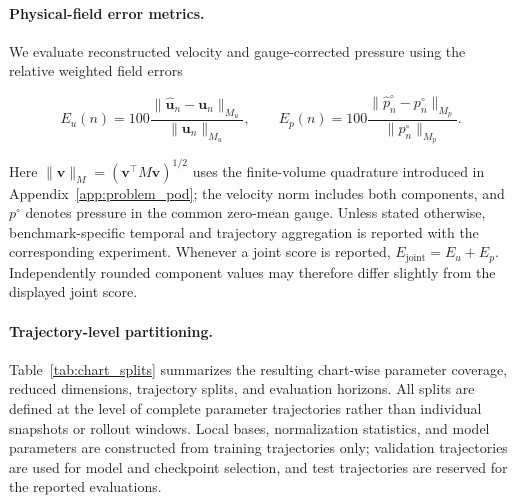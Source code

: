 \documentclass{article}
\begin{document}
\paragraph{Physical-field error metrics.}
We evaluate reconstructed velocity and gauge-corrected pressure using the relative weighted field errors


\begin{equation}
E_u(n)
=
100\frac{
\|\widehat{\bm u}_n-\bm u_n\|_{M_u}
}{
\|\bm u_n\|_{M_u}
},
\qquad
E_p(n)
=
100\frac{
\|\widehat p_n^\circ-p_n^\circ\|_{M_p}
}{
\|p_n^\circ\|_{M_p}
}.
\label{eq:field_errors}
\end{equation}


Here $\|\bm v\|_M=(\bm v^\top M\bm v)^{1/2}$ uses the finite-volume
quadrature introduced in Appendix~\ref{app:problem_pod}; the velocity norm includes both components, and $p^\circ$ denotes pressure in the common zero-mean gauge. Unless stated otherwise, benchmark-specific temporal and trajectory aggregation is reported with the corresponding experiment. Whenever a joint score is reported,
$E_{\mathrm{joint}}=E_u+E_p$. Independently rounded component values may therefore differ slightly from the displayed joint score.


\paragraph{Trajectory-level partitioning.}
Table~\ref{tab:chart_splits} summarizes the resulting chart-wise parameter coverage, reduced dimensions, trajectory splits, and evaluation horizons. All splits are defined at the level of complete parameter trajectories rather than individual snapshots or rollout windows. Local bases, normalization statistics, and model parameters are constructed from training trajectories only; validation trajectories are used for model and checkpoint selection, and test trajectories are reserved for the reported evaluations. 

\par
\end{document}

